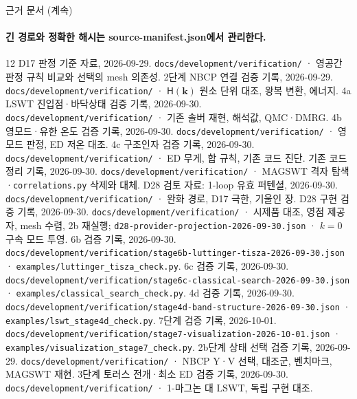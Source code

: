 \begin{frame}[label=sources-continued]{근거 문서 (계속)}
  \framesubtitle{긴 경로와 정확한 해시는 source-manifest.json에서 관리한다.}
  \small
  \begin{thebibliography}{12}
    \setcounter{enumiv}{10}
      D17 판정 기준 자료, 2026-09-29.
      \newblock \texttt{docs/development/verification/} · 영공간 판정 규칙 비교와 선택의 mesh 의존성.
      2단계 NBCP 연결 검증 기록, 2026-09-29.
      \newblock \texttt{docs/development/verification/} · $\mathsf H(\mathbf k)$ 원소 단위 대조, 왕복 변환, 에너지.
      4a LSWT 진입점·바닥상태 검증 기록, 2026-09-30.
      \newblock \texttt{docs/development/verification/} · 기존 솔버 재현, 해석값, QMC·DMRG.
      4b 영모드·유한 온도 검증 기록, 2026-09-30.
      \newblock \texttt{docs/development/verification/} · 영모드 판정, ED 저온 대조.
      4c 구조인자 검증 기록, 2026-09-30.
      \newblock \texttt{docs/development/verification/} · ED 무게, 합 규칙, 기존 코드 진단.
      기존 코드 정리 기록, 2026-09-30.
      \newblock \texttt{docs/development/verification/} · MAGSWT 격자 탐색·\texttt{correlations.py} 삭제와 대체.
      D28 검토 자료: 1-loop 유효 퍼텐셜, 2026-09-30.
      \newblock \texttt{docs/development/verification/} · 완화 경로, D17 극한, 기울인 장.
      D28 구현 검증 기록, 2026-09-30.
      \newblock \texttt{docs/development/verification/} · 시제품 대조, 영점 제공자, mesh 수렴, 2b 재실행; \texttt{d28-provider-projection-2026-09-30.json} · $k=0$ 구속 모드 투영.
      6b 검증 기록, 2026-09-30.
      \newblock \texttt{docs/development/verification/stage6b-luttinger-tisza-2026-09-30.json} · \texttt{examples/luttinger\_tisza\_check.py}.
      6c 검증 기록, 2026-09-30.
      \newblock \texttt{docs/development/verification/stage6c-classical-search-2026-09-30.json} · \texttt{examples/classical\_search\_check.py}.
      4d 검증 기록, 2026-09-30.
      \newblock \texttt{docs/development/verification/stage4d-band-structure-2026-09-30.json} · \texttt{examples/lswt\_stage4d\_check.py}.
      7단계 검증 기록, 2026-10-01.
      \newblock \texttt{docs/development/verification/stage7-visualization-2026-10-01.json} · \texttt{examples/visualization\_stage7\_check.py}.
      2b단계 상태 선택 검증 기록, 2026-09-29.
      \newblock \texttt{docs/development/verification/} · NBCP Y·V 선택, 대조군, 벤치마크, MAGSWT 재현.
      3단계 토러스 전개·최소 ED 검증 기록, 2026-09-30.
      \newblock \texttt{docs/development/verification/} · 1-마그논 대 LSWT, 독립 구현 대조.
  \end{thebibliography}
\end{frame}

